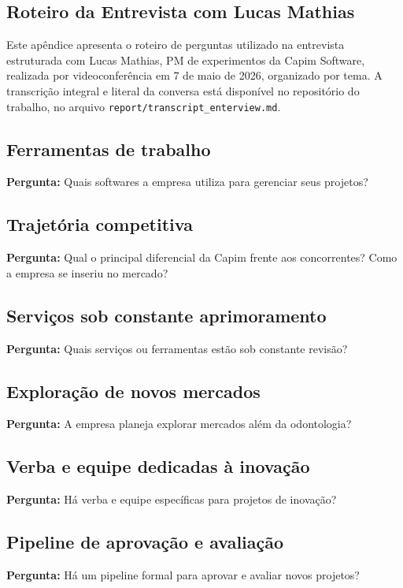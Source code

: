 \begin{apendicesenv}
\partapendices

\chapter{Roteiro da Entrevista com Lucas Mathias}
\label{apend:entrevista}

Este apêndice apresenta o roteiro de perguntas utilizado na entrevista estruturada com Lucas Mathias, PM de experimentos da Capim Software, realizada por videoconferência em 7 de maio de 2026, organizado por tema. A transcrição integral e literal da conversa está disponível no repositório do trabalho, no arquivo \texttt{report/transcript\_enterview.md}.

\section{Ferramentas de trabalho}
\textbf{Pergunta:} Quais softwares a empresa utiliza para gerenciar seus projetos?

\section{Trajetória competitiva}
\textbf{Pergunta:} Qual o principal diferencial da Capim frente aos concorrentes? Como a empresa se inseriu no mercado?

\section{Serviços sob constante aprimoramento}
\textbf{Pergunta:} Quais serviços ou ferramentas estão sob constante revisão?

\section{Exploração de novos mercados}
\textbf{Pergunta:} A empresa planeja explorar mercados além da odontologia?

\section{Verba e equipe dedicadas à inovação}
\textbf{Pergunta:} Há verba e equipe específicas para projetos de inovação?

\section{Pipeline de aprovação e avaliação}
\textbf{Pergunta:} Há um pipeline formal para aprovar e avaliar novos projetos?


\end{apendicesenv}
